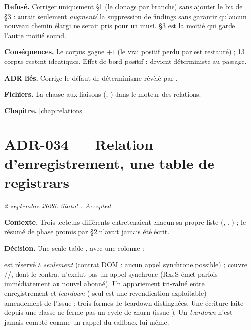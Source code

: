 \textbf{Refusé.} Corriger uniquement §1 (le clonage par branche) sans ajouter
le bit  de §3 : aurait seulement \emph{augmenté} la suppression de
findings sans garantir qu'aucun nouveau chemin élargi ne serait pris pour un
must. §3 est \og la moitié qui garde l'autre moitié sound\fg{}.

\textbf{Conséquences.} Le corpus  gagne $+1$ (le vrai positif
perdu par  est restauré) ; 13 corpus restent identiques. Effet de
bord positif :  devient déterministe au
passage.

\textbf{ADR liés.} Corrige le défaut de déterminisme révélé par .

\textbf{Fichiers.} La chasse aux liaisons (,
) dans le moteur des relations.

\textbf{Chapitre.} \cref{chap:relations}.

\section{ADR-034 --- Relation d'enregistrement, une table de registrars}
\label{adr:34}
\noindent\textit{2 septembre 2026. Statut : Accepted.}

\textbf{Contexte.} Trois lecteurs différents entretenaient chacun sa propre
liste (, , ) ;
le résumé de phase promis par  §2 n'avait jamais été écrit.

\textbf{Décision.} Une seule table \code{\&[Registrar]}, avec une colonne
 :


 est réservé à  \emph{seulement} (contrat
DOM : aucun appel synchrone possible) ;  couvre //,
dont le contrat n'exclut pas un appel synchrone (RxJS 
émet parfois immédiatement au nouvel abonné). Un appariement tri-valué entre
enregistrement et \emph{teardown} ( seul est une revendication
exploitable) --- amendement de l'issue  : trois formes de teardown
distinguées. Une écriture faite depuis une classe  ne ferme pas
un cycle de churn (issue ). Un \emph{teardown} n'est jamais
compté comme un rappel du callback lui-même.

